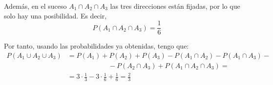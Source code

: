\begin{ejercicio}
    Además, en el suceso $A_1\cap A_2 \cap A_3$ las tres direcciones están fijadas, por lo que solo hay una posibilidad. Es decir,
    \begin{equation*}
        P(A_1\cap A_2 \cap A_3) = \frac{1}{6}
    \end{equation*}

    Por tanto, usando las probabilidades ya obtenidas, tengo que:
    \begin{equation*}\begin{split}
        P(A_1 \cup A_2 \cup A_3) &= P(A_1) + P(A_2) + P(A_3) - P(A_1\cap A_2) - P(A_1\cap A_3) -\\
        &\qquad \qquad \qquad- P(A_2\cap A_3) + P(A_1 \cap A_2 \cap A_3) =\\
        &= 3\cdot \frac{1}{3} -3\cdot \frac{1}{6} + \frac{1}{6} = \frac{2}{3}
    \end{split}\end{equation*}
    
\end{ejercicio}
